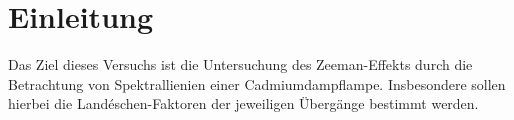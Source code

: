 \section{Einleitung}
Das Ziel dieses Versuchs ist die Untersuchung des Zeeman-Effekts durch die Betrachtung von Spektrallienien einer Cadmiumdampflampe. Insbesondere sollen hierbei
die Landéschen-Faktoren der jeweiligen Übergänge bestimmt werden.
